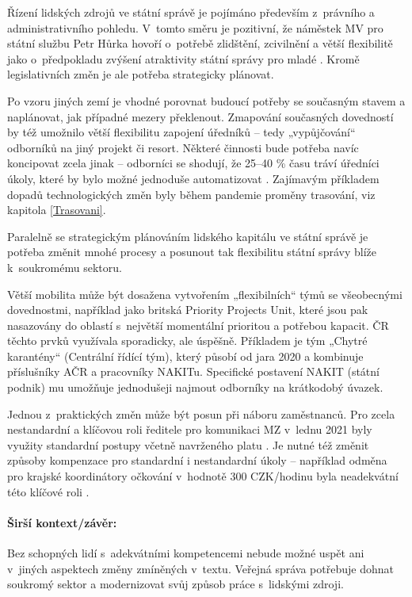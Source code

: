 Řízení lidských zdrojů ve státní správě je pojímáno především z~právního a administrativního pohledu. V~tomto směru je pozitivní, že náměstek MV pro státní službu Petr Hůrka \cite{plihalova_z_2020} hovoří o~potřebě zlidštění, zcivilnění a větší flexibilitě jako o~předpokladu zvýšení atraktivity státní správy pro mladé \cite{mpo2021}. Kromě legislativních změn je ale potřeba strategicky plánovat.

Po vzoru jiných zemí \cite{thomas_finding_2021, ministere_gestion_2015} je vhodné porovnat budoucí potřeby se současným stavem a naplánovat, jak případné mezery překlenout. Zmapování současných dovedností by též umožnilo větší flexibilitu zapojení úředníků -- tedy „vypůjčování“ odborníků na jiný projekt či resort. Některé činnosti bude potřeba navíc koncipovat zcela jinak -- odborníci se shodují, že 25--40 \% času tráví úředníci úkoly, které by bylo možné jednoduše automatizovat \cite{department_of_the_prime_minister_and_cabinet_our_2019, deloitte_augmented_2017}. Zajímavým příkladem dopadů technologických změn byly během pandemie proměny trasování, viz kapitola \ref{Trasovani}.

Paralelně se strategickým plánováním lidského kapitálu ve státní správě je po\-tře\-ba změnit mnohé procesy a posunout tak flexibilitu státní správy blíže k~soukromému sektoru.

Větší mobilita může být dosažena vytvořením „flexibilních“ týmů se všeobecnými dovednostmi, například jako britská Priority Projects Unit, které jsou pak nasazovány do oblastí s~největší momentální prioritou a potřebou kapacit. ČR těchto prvků využívala sporadicky, ale úspěšně. Příkladem je tým „Chytré karantény“ (Centrální řídící tým), který působí od jara 2020 a kombinuje příslušníky AČR a pracovníky NAKITu. Specifické postavení NAKIT (státní podnik) mu umožňuje jednodušeji najmout odborníky na krátkodobý úvazek.

Jednou z~praktických změn může být posun při náboru zaměstnanců. Pro zcela nestandardní a klíčovou roli ředitele pro komunikaci MZ v~lednu 2021 byly využity standardní postupy včetně navrženého platu \cite{irozhlas_ministerstvo_2021}. Je nutné též změnit způsoby kompenzace pro standardní i nestandardní úkoly -- například odměna pro krajské koordinátory očkování v~hodnotě 300 CZK/hodinu byla neadekvátní této klíčové roli \cite{michal_blaha_pandemie_2021}.

\paragraph{Širší kontext/závěr:} Bez schopných lidí s~adekvátními kompetencemi nebude možné uspět ani v~jiných aspektech změny zmíněných v~textu. Veřejná správa potřebuje dohnat soukromý sektor a modernizovat svůj způsob práce s~lidskými zdroji.

